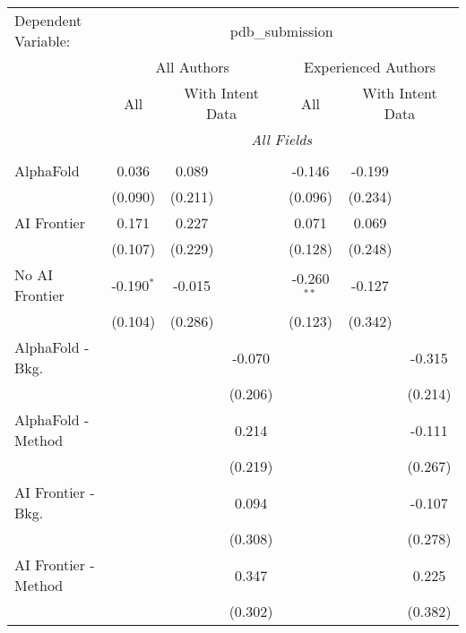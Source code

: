 \begingroup
\centering
\begin{tabular}{lcccccc}
   \tabularnewline \midrule \midrule
   Dependent Variable: & \multicolumn{6}{c}{pdb\_submission}\\
 & \multicolumn{3}{c}{All Authors} & \multicolumn{3}{c}{Experienced Authors} \\
\cmidrule(lr){2-4} \cmidrule(lr){5-7}
 & \multicolumn{1}{c}{All} & \multicolumn{2}{c}{With Intent Data} & \multicolumn{1}{c}{All} & \multicolumn{2}{c}{With Intent Data} \\
\cmidrule(lr){2-2} \cmidrule(lr){3-4} \cmidrule(lr){5-5} \cmidrule(lr){6-7}
 & \multicolumn{6}{c}{\textit{All Fields}} \\ \\
   AlphaFold               & 0.036        & 0.089   &         & -0.146        & -0.199  &   \\   
                           & (0.090)      & (0.211) &         & (0.096)       & (0.234) &   \\   
   AI Frontier             & 0.171        & 0.227   &         & 0.071         & 0.069   &   \\   
                           & (0.107)      & (0.229) &         & (0.128)       & (0.248) &   \\   
   No AI Frontier          & -0.190$^{*}$ & -0.015  &         & -0.260$^{**}$ & -0.127  &   \\   
                           & (0.104)      & (0.286) &         & (0.123)       & (0.342) &   \\   
   AlphaFold - Bkg.        &              &         & -0.070  &               &         & -0.315\\   
                           &              &         & (0.206) &               &         & (0.214)\\   
   AlphaFold - Method      &              &         & 0.214   &               &         & -0.111\\   
                           &              &         & (0.219) &               &         & (0.267)\\   
   AI Frontier - Bkg.      &              &         & 0.094   &               &         & -0.107\\   
                           &              &         & (0.308) &               &         & (0.278)\\   
   AI Frontier - Method    &              &         & 0.347   &               &         & 0.225\\   
                           &              &         & (0.302) &               &         & (0.382)\\   

\end{tabular}
